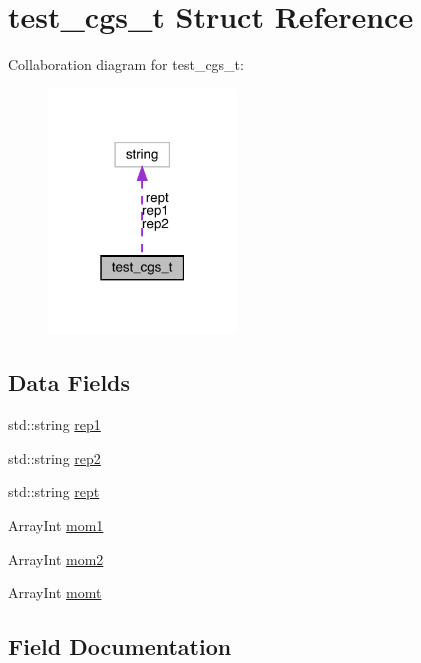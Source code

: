 \hypertarget{structtest__cgs__t}{}\section{test\+\_\+cgs\+\_\+t Struct Reference}
\label{structtest__cgs__t}


Collaboration diagram for test\+\_\+cgs\+\_\+t\+:\nopagebreak
\begin{figure}[H]
\begin{center}
\leavevmode
\includegraphics[width=142pt]{d4/dc8/structtest__cgs__t__coll__graph}
\end{center}
\end{figure}
\subsection*{Data Fields}
\begin{DoxyCompactItemize}
\item 
std\+::string \mbox{\hyperlink{structtest__cgs__t_a5fb0ff965bed9ea4deeb71b44c41290d}{rep1}}
\item 
std\+::string \mbox{\hyperlink{structtest__cgs__t_af4454e8654629c7049f59b76fb58cb33}{rep2}}
\item 
std\+::string \mbox{\hyperlink{structtest__cgs__t_a3c4d841a7a29f1097cc92aa552bb4a12}{rept}}
\item 
Array\+Int \mbox{\hyperlink{structtest__cgs__t_a5baa81cf39da254bffdc73371b9dfbd2}{mom1}}
\item 
Array\+Int \mbox{\hyperlink{structtest__cgs__t_a04979302e5ec3607d41a2956118fd0be}{mom2}}
\item 
Array\+Int \mbox{\hyperlink{structtest__cgs__t_abb63347b7e26fc094cd702ba52c36172}{momt}}
\end{DoxyCompactItemize}


\subsection{Field Documentation}
\mbox{\label{structtest__cgs__t_a5baa81cf39da254bffdc73371b9dfbd2}} 
